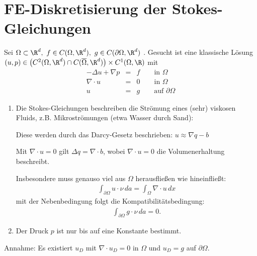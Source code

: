 \section{FE-Diskretisierung der Stokes-Gleichungen}


\begin{Definition}
    \label{def:5.1}
    Sei $\Omega\subset \R^d, \ f\in C(\Omega, \R^d), \ g\in C(\partial\Omega, \R^d)$
    . Gesucht ist eine klassische Lösung  $(u, p)\in \big( C^2(\Omega, \R^d) \cap
    C(\overline\Omega, \R^d) \big) \times C^1(\Omega, \R)$ mit
    \begin{eqnarray*}
        -\Delta u + \nabla p &=& f \qquad \text{in } \Omega \\
        \nabla \cdot u &=& 0 \qquad \text{in } \Omega \\
        u &=& g \qquad \text{auf } \partial\Omega
    \end{eqnarray*}
\end{Definition}


\begin{Bemerkung}
    \begin{enumerate}[1)]
      \item
        Die Stokes-Gleichungen beschreiben die Strömung eines (sehr) viskosen
        Fluids, z.B. Mikroströmungen (etwa Wasser durch Sand):

        Diese werden durch das Darcy-Gesetz beschrieben:
        $u \approx \nabla q -b$

        Mit $\nabla \cdot u = 0$ gilt $\Delta q = \nabla \cdot b$, wobei
        $\nabla \cdot u = 0$ die Volumenerhaltung beschreibt.

        Insbesondere muss genauso viel aus $\Omega$ herausfließen wie hineinfließt:
        \begin{eqnarray*}
              \int_{\partial\Omega} u \cdot \nu \,da
            = \int_\Omega \nabla \cdot u \,dx
        \end{eqnarray*}
        mit der Nebenbedingung folgt die Kompatibilitätsbedingung:
        \begin{eqnarray*}
            \int_{\partial\Omega} g \cdot \nu \,da = 0.
        \end{eqnarray*}
      \item
        Der Druck $p$ ist nur bis auf eine Konstante bestimmt.
    \end{enumerate}
\end{Bemerkung}


Annahme: Es existiert $u_D$ mit $\nabla \cdot u_D = 0$ in $\Omega$ und $u_D = g$ auf
$\partial\Omega$.

